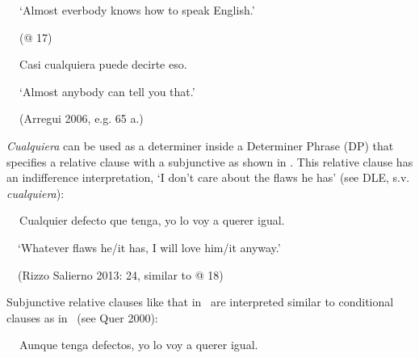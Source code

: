 \begin{styleStandard}
\textbf{\ \ }‘Almost everbody knows how to speak English.’
\end{styleStandard}

\begin{styleStandard}
\textbf{\ \ }(@ 17)
\end{styleStandard}

\begin{styleStandard}
\textbf{\ \ }Casi cualquiera puede decirte eso.
\end{styleStandard}

\begin{styleStandard}
\textbf{\ \ }‘Almost anybody can tell you that.’
\end{styleStandard}

\begin{styleStandard}
\textbf{\ \ }(Arregui 2006, e.g. 65 a.)
\end{styleStandard}

\begin{styleStandard}
\textit{Cualquiera} can be used as a determiner inside a Determiner Phrase (DP) that specifies a relative clause with a subjunctive as shown in . This relative clause has an indifference interpretation, ‘I don’t care about the flaws he has’ (see DLE, s.v. \textit{cualquiera}):
\end{styleStandard}

\begin{styleStandard}
\label{bkm:Ref512708}\textbf{\ \ }Cualquier defecto que tenga, yo lo voy a querer igual.
\end{styleStandard}

\begin{styleStandard}
\ \ ‘Whatever flaws he/it has, I will love him/it anyway.’
\end{styleStandard}

\begin{styleStandard}
\ \ (Rizzo Salierno 2013: 24, similar to @ 18)
\end{styleStandard}

\begin{styleStandard}
Subjunctive relative clauses like that in \ are interpreted similar to conditional clauses as in \ (see Quer 2000):
\end{styleStandard}

\begin{styleStandard}
\label{bkm:Ref513122}\textbf{\ \ }Aunque tenga defectos, yo lo voy a querer igual.
\end{styleStandard}

